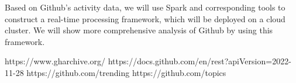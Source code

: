 \documentclass[conference]{IEEEtran}
\begin{document}
Based on Github's activity data, we will use Spark and corresponding tools to construct a real-time processing framework, which will be deployed on a cloud cluster. We will show more comprehensive analysis of Github by using this framework.







\begin{thebibliography}{00}
https://www.gharchive.org/
https://docs.github.com/en/rest?apiVersion=2022-11-28
https://github.com/trending
https://github.com/topics
\end{thebibliography}


\end{document}
